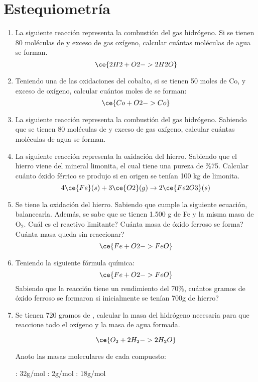 \section{Estequiometría}

\begin{enumerate}
\item La siguiente reacción representa la combustión del gas hidrógeno. Si se tienen 80 moléculas de  y exceso de gas oxígeno, calcular cuántas moléculas de agua se forman.
$$
\ce{2H2 + O2 -> 2H2O}
$$

\item Teniendo una de las oxidaciones del cobalto, si se tienen 50 moles de Co, y exceso de oxígeno, calcular cuántos moles de   se forman:
$$
\ce{Co + O2 -> Co}
$$

\item La siguiente reacción representa la combustión del gas hidrógeno. Sabiendo que se tienen 80 moléculas de  y exceso de gas oxígeno, calcular cuántas moléculas de agua se forman.

\item La siguiente reacción representa la oxidación del hierro.
Sabiendo que el hierro viene del mineral limonita, el
cual tiene una pureza de \%75. Calcular cuánto óxido férrico
se produjo si en origen se tenían 100 kg de limonita.
$$4\ce{Fe} (s) + 3\ce{O2} (g) \rightarrow 2\ce{Fe2O3} (s)$$

\item Se tiene la oxidación del hierro. Sabiendo que cumple la siguiente ecuación, balancearla. Además, se sabe que se tienen 1.500 g de Fe y la misma masa de O$_2$. Cuál es el reactivo limitante? Cuánta masa de óxido ferroso se forma? Cuánta masa queda sin reaccionar?
$$\ce{Fe + O2 -> FeO}$$


\item Teniendo la siguiente fórmula química:
$$\ce{Fe + O2 -> FeO}$$
Sabiendo que la reacción tiene un rendimiento del 70\%, cuántos gramos de óxido ferroso se formaron si inicialmente se tenían 700g de hierro?


\item Se tienen 720 gramos de , calcular la masa del hidrógeno
necesaria para que reaccione todo el oxígeno y la masa de 
agua formada.

$$\ce{O_2 + 2H_2 -> 2H_2O}$$

Anoto las masas moleculares de cada compuesto:

\hfil{}: 32g/mol\hfil
{}: 2g/mol\hfil
{}: 18g/mol\hfil


\end{enumerate}

